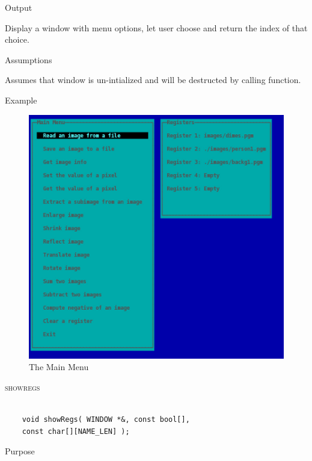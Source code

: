 \documentclass[pdftex, 11pt]{article}
\begin{document}
\begin{description}
\begin{description}
\begin{itemize}
				\end{itemize}

			\item{Output}
				
				Display a window with menu options, let user choose and
				return the index of that choice.

			\item{Assumptions}

				Assumes that window is un-intialized and will be destructed
				by calling function.

			\item{Example}

				\begin{figure}[ht!]
					\centering
					\caption{The Main Menu}
					\includegraphics{images/menu.png}
				\end{figure}

		\end{description}


	\item{\textsc{showregs}}

		\begin{lstlisting}

	void showRegs( WINDOW *&, const bool[], 
	const char[][NAME_LEN] );	
		\end{lstlisting}

		\begin{description}
			\item{Purpose}


\end{description}
\end{description}
\end{document}
